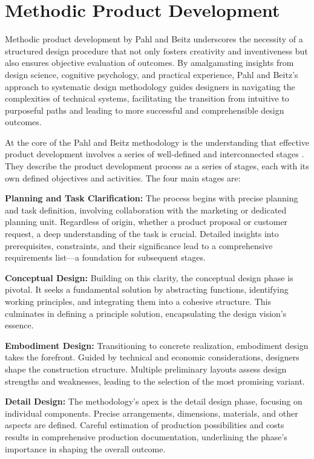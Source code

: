 \chapter{Methodic Product Development}
\label{ch:methodicproductdevelopment}

Methodic product development by Pahl and Beitz underscores the necessity of a structured design procedure that not only fosters creativity and inventiveness but also ensures objective evaluation of outcomes. By amalgamating insights from design science, cognitive psychology, and practical experience, Pahl and Beitz's approach to systematic design methodology guides designers in navigating the complexities of technical systems, facilitating the transition from intuitive to purposeful paths and leading to more successful and comprehensible design outcomes. \cite{Pahl07j}

At the core of the Pahl and Beitz methodology is the understanding that effective product development involves a series of well-defined and interconnected stages \cite{Pahl07k}. They describe the product development process as a series of stages, each with its own defined objectives and activities. The four main stages are:

\textbf{Planning and Task Clarification:} The process begins with precise planning and task definition, involving collaboration with the marketing or dedicated planning unit. Regardless of origin, whether a product proposal or customer request, a deep understanding of the task is crucial. Detailed insights into prerequisites, constraints, and their significance lead to a comprehensive requirements list—a foundation for subsequent stages.

\textbf{Conceptual Design:} Building on this clarity, the conceptual design phase is pivotal. It seeks a fundamental solution by abstracting functions, identifying working principles, and integrating them into a cohesive structure. This culminates in defining a principle solution, encapsulating the design vision's essence.

\textbf{Embodiment Design:} Transitioning to concrete realization, embodiment design takes the forefront. Guided by technical and economic considerations, designers shape the construction structure. Multiple preliminary layouts assess design strengths and weaknesses, leading to the selection of the most promising variant.

\textbf{Detail Design:} The methodology's apex is the detail design phase, focusing on individual components. Precise arrangements, dimensions, materials, and other aspects are defined. Careful estimation of production possibilities and costs results in comprehensive production documentation, underlining the phase's importance in shaping the overall outcome.

